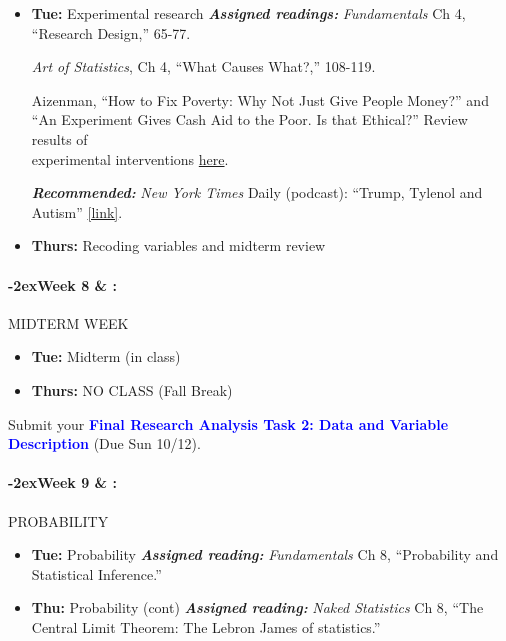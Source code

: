 \documentclass[11pt]{article}
\newcommand{\week}[1]{

  \paragraph*{\kern-2ex\quad #1 \AdvanceDate[1]\syldate{\today} \& \AdvanceDate[2]\syldate{\today} :}

  \ifdim\wd1=\wd\MONDAY
    \AdvanceDate[7]
  \else
    \AdvanceDate[7]
  \fi
}
\begin{document}
\begin{itemize}
\item [] \textbf{Tue:} Experimental research
   \subitem \textbf{\textit{Assigned readings:}}
    \subsubitem \textit{Fundamentals} Ch 4, ``Research Design,'' 65-77.

    \subsubitem \textit{Art of Statistics}, Ch 4, ``What Causes What?,'' 108-119.

    \subsubitem Aizenman, ``How to Fix Poverty: Why Not Just Give People Money?'' and \\\vspace{-20pt} \subsubitem ``An Experiment Gives Cash Aid to the Poor. Is that Ethical?'' Review results of \\\vspace{-20pt} \subsubitem experimental interventions \href{https://www.givedirectly.org/gdresearch/}{here}.

\subitem \textbf{\textit{Recommended:}} \textit{New York Times} Daily (podcast): ``Trump, Tylenol and Autism'' \href{https://www.nytimes.com/2025/09/23/podcasts/the-daily/autism-trump-tylenol.html}{[link]}.

    \item [] \textbf{Thurs:} Recoding variables and midterm review
\end{itemize}

\week{Week 8} MIDTERM WEEK

\begin{itemize}
    \item[] \textbf{Tue:} Midterm (in class)
    \item[] \textbf{Thurs:} NO CLASS (Fall Break)
\end{itemize}

\noindent Submit your \textcolor{blue}{\textbf{Final Research Analysis Task 2: Data and Variable Description}} (Due Sun 10/12).

\week{Week 9} PROBABILITY

\begin{itemize}
    \item [] \textbf{Tue:} Probability
    \subitem \textbf{\textit{Assigned reading:}} \textit{Fundamentals} Ch 8, ``Probability and Statistical Inference.''
    \item [] \textbf{Thu:} Probability (cont)
    \subitem \textbf{\textit{Assigned reading:}} \textit{Naked Statistics} Ch 8, ``The Central Limit Theorem: The Lebron James\vspace{-5pt} \subitem of statistics.''
\end{itemize}
\end{document}
